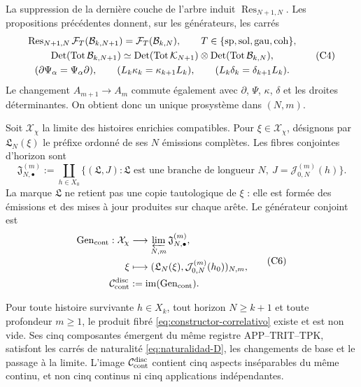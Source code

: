 La suppression de la dernière couche de l'arbre induit
\(\operatorname{Res}_{N+1,N}\). Les propositions précédentes donnent, sur les
générateurs, les carrés
\[
\begin{gathered}
 \operatorname{Res}_{N+1,N}\mathcal F_T(\mathcal B_{k,N+1})
 =\mathcal F_T(\mathcal B_{k,N}),
 \qquad T\in\{{\rm sp},{\rm sol},{\rm gau},{\rm coh}\},\\
 \operatorname{Det}(\operatorname{Tot}\mathcal B_{k,N+1})
 \simeq
 \operatorname{Det}(\operatorname{Tot}\mathcal K_{N+1})
 \otimes
 \operatorname{Det}(\operatorname{Tot}\mathcal B_{k,N}),\\
 (\partial\Psi_\alpha=\Psi_\alpha\partial),\qquad
 (L_k\kappa_k=\kappa_{k+1}L_k),\qquad
 (L_k\delta_k=\delta_{k+1}L_k).
\end{gathered}
 \tag{C4}
 \label{eq:naturalidad-D}
\]
Le changement \(A_{m+1}\to A_m\) commute également avec \(\partial\), \(\Psi\),
\(\kappa\), \(\delta\) et les droites déterminantes. On obtient donc
un unique prosystème dans \((N,m)\).

Soit \(\mathcal X_\chi\) la limite des histoires enrichies compatibles. Pour \(\xi\in\mathcal X_\chi\), désignons par \(\mathfrak L_N(\xi)\) le préfixe ordonné de ses \(N\) émissions complètes. Les fibres conjointes d'horizon sont
\[
 \mathfrak J_{N,\bullet}^{(m)}
 :=\coprod_{h\in X_0}
 \{(\mathfrak L,J):\mathfrak L\text{ est une branche de longueur }N,
       \ J=\mathcal J_{0,N}^{(m)}(h)\}.
 \tag{C5}
 \label{eq:fibras-conjuntas-horizonte}
\]
La marque \(\mathfrak L\) ne retient pas une copie tautologique de \(\xi\) : elle est
formée des émissions et des mises à jour produites sur chaque arête. Le
générateur conjoint est
\[
\begin{aligned}
 \operatorname{Gen}_{\rm cont}:\mathcal X_\chi
   &\longrightarrow\varprojlim_{N,m}\mathfrak J_{N,\bullet}^{(m)},\\
 \xi&\longmapsto
   (\mathfrak L_N(\xi),\mathcal J_{0,N}^{(m)}(h_0))_{N,m},\\
 \mathcal C_{\rm cont}^{\rm disc}
   &:=\operatorname{im}(\operatorname{Gen}_{\rm cont}).
\end{aligned}
 \tag{C6}
 \label{eq:continuo-discreto}
\]

\begin{theorem}
\label{thm:correlacion-cinco}
Pour toute histoire survivante \(h\in X_k\), tout horizon
\(N\geq k+1\) et toute profondeur \(m\geq1\), le produit fibré
\eqref{eq:constructor-correlativo} existe et est non vide. Ses cinq
composantes émergent du même registre APP--TRIT--TPK, satisfont les
carrés de naturalité \eqref{eq:naturalidad-D}, les changements de base et le
passage à la limite. L'image \(\mathcal C_{\rm cont}^{\rm disc}\) contient cinq
aspects inséparables du même continu, et non cinq continus ni cinq
applications indépendantes.
\end{theorem}

